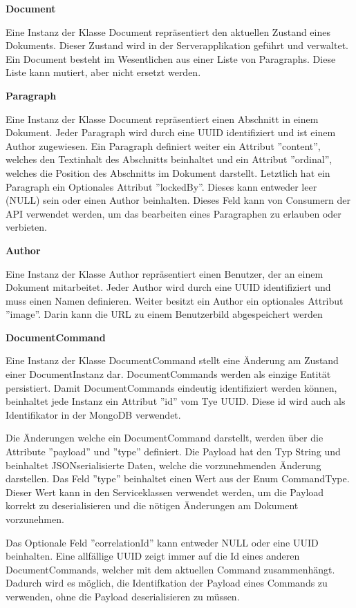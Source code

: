 \textbf{Document}

Eine Instanz der Klasse Document repräsentiert den aktuellen Zustand eines Dokuments.
Dieser Zustand wird in der Serverapplikation geführt und verwaltet.
Ein Document besteht im Wesentlichen aus einer Liste von Paragraphs.
Diese Liste kann mutiert, aber nicht ersetzt werden.

\textbf{Paragraph}

Eine Instanz der Klasse Document repräsentiert einen Abschnitt in einem Dokument.
Jeder Paragraph wird durch eine UUID identifiziert und ist einem Author zugewiesen.
Ein Paragraph definiert weiter ein Attribut ''content'',  welches den Textinhalt des Abschnitts beinhaltet und ein Attribut ''ordinal'', welches die Position des Abschnitts im Dokument darstellt.
Letztlich hat ein Paragraph ein Optionales Attribut ''lockedBy''.
Dieses kann entweder leer (NULL) sein oder einen Author beinhalten.
Dieses Feld kann von Consumern der API verwendet werden, um das bearbeiten eines Paragraphen zu erlauben oder verbieten.

\textbf{Author}

Eine Instanz der Klasse Author repräsentiert einen Benutzer, der an einem Dokument mitarbeitet.
Jeder Author wird durch eine UUID identifiziert und muss einen Namen definieren.
Weiter besitzt ein Author ein optionales Attribut ''image''.
Darin kann die URL zu einem Benutzerbild abgespeichert werden

\clearpage

\textbf{DocumentCommand}

Eine Instanz der Klasse DocumentCommand stellt eine Änderung am Zustand einer Document\-Instanz dar.
DocumentCommands werden als einzige Entität persistiert.
Damit DocumentCommands eindeutig identifiziert werden können, beinhaltet jede Instanz ein Attribut ''id'' vom Tye UUID\@.
Diese id wird auch als Identifikator in der MongoDB verwendet.

Die Änderungen welche ein DocumentCommand darstellt, werden über die Attribute ''payload'' und ''type'' definiert.
Die Payload hat den Typ String und beinhaltet JSON\-serialisierte Daten, welche die vorzunehmenden Änderung darstellen.
Das Feld ''type'' beinhaltet einen Wert aus der Enum CommandType.
Dieser Wert kann in den Serviceklassen verwendet werden, um die Payload korrekt zu deserialisieren und die nötigen Änderungen am Dokument vorzunehmen.

Das Optionale Feld ''correlationId'' kann entweder NULL oder eine UUID beinhalten.
Eine allfällige UUID zeigt immer auf die Id eines anderen DocumentCommands, welcher mit dem aktuellen Command zusammenhängt.
Dadurch wird es möglich, die Identifkation der Payload eines Commands zu verwenden, ohne die Payload deserialisieren zu müssen.

